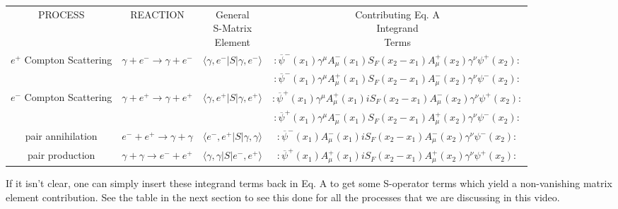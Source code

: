 \documentclass[a4]{article}
\begin{document}
    \begin{framed}
        \begin{tabular}{c c c c}
            PROCESS & REACTION & \shortstack{General \\ S-Matrix \\ Element} & \shortstack{Contributing Eq. A \\ Integrand \\ Terms} \\
            \vspace{0.1mm}
            $e^{+}$ Compton Scattering & $\gamma + e^{-} \rightarrow \gamma + e^{-}$ & $\langle \gamma , e^{-} | S | \gamma , e^{-} \rangle$ & $:\overline{\psi}^{-} (x_1) \gamma^{\mu} A^{-}_{\mu} (x_1) S_{F} (x_{2} - x_{1}) A^{+}_{\mu} (x_2) \gamma^{\nu} \psi^{+} (x_2):$ \\
            & & & $:\overline{\psi}^{-} (x_1) \gamma^{\mu} A^{+}_{\mu} (x_1) S_{F} (x_{2} - x_{1}) A^{-}_{\mu} (x_2) \gamma^{\nu} \psi^{-} (x_2):$ \\
            $e^{-}$ Compton Scattering & $\gamma + e^{+} \rightarrow \gamma + e^{+}$ & $\langle \gamma , e^{+} | S | \gamma , e^{+} \rangle$ & $:\overline{\psi}^{+} (x_1) \gamma^{\mu} A^{+}_{\mu} (x_1) i S_{F} (x_{2} - x_{1}) A^{-}_{\mu} (x_2) \gamma^{\nu} \psi^{+} (x_2):$ \\
            & & & $:\overline{\psi}^{+} (x_1) \gamma^{\mu} A^{-}_{\mu} (x_1) S_{F} (x_{2} - x_{1}) A^{+}_{\mu} (x_2) \gamma^{\nu} \psi^{-} (x_2):$ \\
            pair annihilation & $e^{-} + e^{+} \rightarrow \gamma + \gamma$ & $\langle e^{-} , e^{+} | S | \gamma , \gamma \rangle$ & $:\overline{\psi}^{-} (x_1) A^{-}_{\mu} (x_1) i S_{F} (x_{2} - x_{1}) A^{-}_{\mu} (x_2) \gamma^{\nu} \psi^{-} (x_2):$ \\
            pair production & $\gamma + \gamma \rightarrow e^{-} + e^{+}$ & $\langle \gamma , \gamma | S | e^{-} , e^{+} \rangle$ & $:\overline{\psi}^{+} (x_1) A^{+}_{\mu} (x_1) i S_{F} (x_{2} - x_{1}) A^{+}_{\mu} (x_2) \gamma^{\nu} \psi^{+} (x_2):$ \\
        \end{tabular}
    \end{framed}

    If it isn't clear, one can simply insert these integrand terms back in Eq. A to get some S-operator terms which yield a non-vanishing matrix element
    contribution. See the table in the next section to see this done for all the processes that we are discussing in this video.
\end{document}
